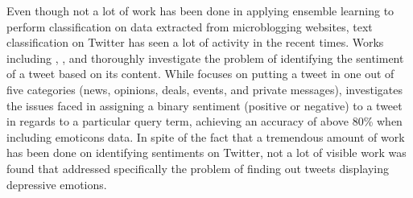 Even though not a lot of work has been done in applying ensemble learning to perform classification on data extracted from microblogging websites, text classification on Twitter has seen a lot of activity in the recent times. Works including \cite{sriram2010short}, \cite{go2009twitter}, and \cite{jiang2011target} thoroughly investigate the problem of identifying the sentiment of a tweet based on its content. While \cite{sriram2010short} focuses on putting a tweet in one out of five categories (news, opinions, deals, events, and private messages), \cite{go2009twitter} investigates the issues faced in assigning a binary sentiment (positive or negative) to a tweet in regards to a particular query term, achieving an accuracy of above 80\% when including emoticons data. In spite of the fact that a tremendous amount of work has been done on identifying sentiments on Twitter, not a lot of visible work was found that addressed specifically the problem of finding out tweets displaying depressive emotions.\\
